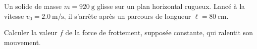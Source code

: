 Un solide de masse $m=\qty{920}{\g}$ glisse sur un plan horizontal rugueux.
Lancé à la vitesse $v_0=\qty{2.0}{\m\per\s}$, il s'arrête après un parcours de
longueur $\ell=\qty{80}{\cm}$.

Calculer la valeur $f$ de la force de frottement, supposée constante, qui
ralentit son mouvement.
